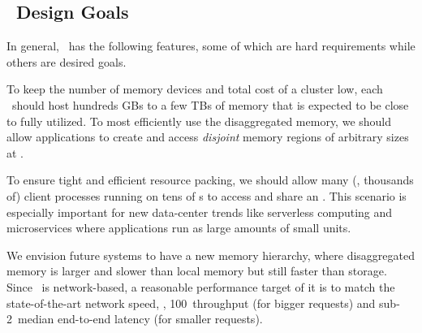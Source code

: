 \subsection{\md\ Design Goals}
\label{sec:requirements}
In general, \md\ has the following features, some of which are hard requirements while others are desired goals.

To keep the number of memory devices and total cost of a cluster low,
each \MN\ should host hundreds GBs to a few TBs of memory that is expected to be close to fully utilized.
To most efficiently use the disaggregated memory, we should allow applications to create and access {\em disjoint} memory regions of arbitrary sizes at \MN.

To ensure tight and efficient resource packing,
we should allow many (\eg, thousands of) client processes running on tens of \CN{}s to access and share an \MN.
This scenario is especially important for new data-center trends like serverless computing and microservices where applications run as large amounts of small units.

We envision future systems to have a new memory hierarchy, where disaggregated memory is larger and slower than local memory but still faster than storage.
Since \md\ is network-based, a reasonable performance target of it is to match the state-of-the-art network speed,
\ie, 100\Gbps\ throughput (for bigger requests) and sub-2\mus\ median end-to-end latency (for smaller requests).
 
